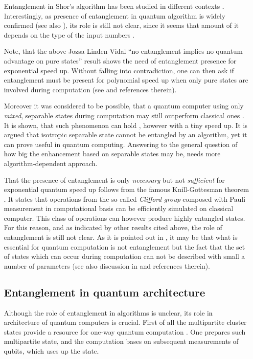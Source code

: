 \documentclass[rmp,12pt,preprint]{revtex4-2}
\begin{document}
Entanglement in Shor's algorithm has been studied in different
contexts
\cite{EkertJozsa,JozsaLinden,ParkerPlenio,ShimoniShapiraBiham}.
Interestingly, as presence of entanglement in quantum algorithm is
widely confirmed (see also
\cite{AdattaV_ent_mixed_comp2006,ADattaFCC_1q_comp2005}), its role is
still not clear, since it seems that amount of it depends on the type
of the input numbers \cite{KendonMunro}.

Note, that the above Jozsa-Linden-Vidal ``no entanglement implies no
quantum advantage on pure states'' result shows the need of
entanglement presence for exponential speed up. Without falling into
contradiction, one can then ask if entanglement must be present for
polynomial speed up when only pure states are involved during
computation (see \cite{KenigsbergMoreRatsaby} and references
therein).

Moreover it was considered to be possible, that a quantum computer
using only {\it mixed}, separable states during computation may
still outperform classical ones \cite{JozsaLinden}. It is shown,
that such phenomenon can hold \cite{Tal1}, however with a tiny speed
up. It is argued that isotropic separable state cannot be entangled
by an algorithm, yet it can prove useful in quantum computing.
Answering to the general question of how big the enhancement
based on separable states may be, needs more algorithm-dependent
approach.

That the presence of entanglement is only {\it necessary} but not
{\it sufficient} for exponential quantum speed up follows from the
famous Knill-Gottesman theorem \cite{GottesmanC1999-Knill,JozsaLinden}.
It states that operations from the so called {\it
Clifford group} composed with Pauli measurement in
computational basis can be efficiently simulated on
classical computer. This class of operations can however produce
highly entangled states. For this reason, and as indicated by other
results cited above, the role of entanglement is still not
clear. As it is pointed out in \cite{JozsaLinden}, it may be that
what is essential for quantum computation is not entanglement but
the fact that the set of states which can occur during computation
can not be described with small a number of parameters
(see also discussion in \cite{Knill-ent-comp2001} and
references therein).

\subsection{Entanglement in quantum architecture}
Although the role of entanglement in algorithms is unclear,
its role in architecture of quantum computers is crucial. First of
all the multipartite cluster states provide a resource for one-way
quantum computation
\cite{RaussendorfBriegelOneWay}. One
prepares such multipartite state, and the computation bases on
subsequent measurements of qubits, which uses up the state.
\end{document}
